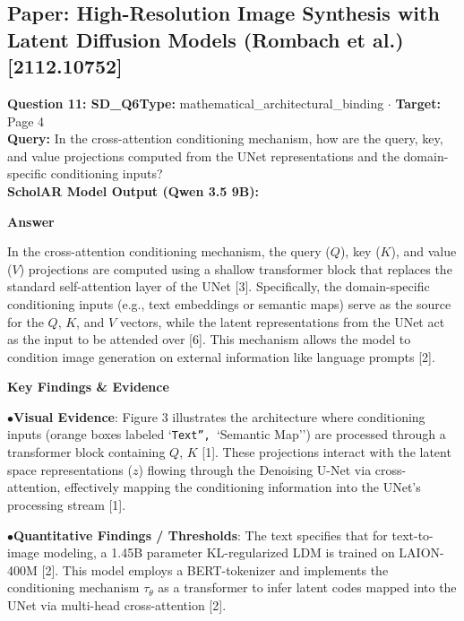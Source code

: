\documentclass[10pt,a4paper]{article}
\begin{document}
\subsection{Paper: High-Resolution Image Synthesis with Latent Diffusion Models (Rombach et al.) [2112.10752]}
\vspace{-4pt}
\begin{tcolorbox}[questionbox]
{\noindent\bfseries\large\color{navy} Question 11: SD\_Q6}\hfill {\footnotesize\color{darkteal}\textbf{Type:} mathematical\_architectural\_binding $\cdot$ \textbf{Target:} Page 4}\\[4pt]
{\noindent\bfseries\color{accentblue} Query: } In the cross-attention conditioning mechanism, how are the query, key, and value projections computed from the UNet representations and the domain-specific conditioning inputs?\\[6pt]
{\noindent\bfseries\color{navy} ScholAR Model Output (Qwen 3.5 9B):}\\[2pt]
{\small \noindent \textbf{Answer}\par\vspace{3pt}In the cross-attention conditioning mechanism, the query ($Q$), key ($K$), and value ($V$) projections are computed using a shallow transformer block that replaces the standard self-attention layer of the UNet [3]. Specifically, the domain-specific conditioning inputs (e.g., text embeddings or semantic maps) serve as the source for the $Q$, $K$, and $V$ vectors, while the latent representations from the UNet act as the input to be attended over [6]. This mechanism allows the model to condition image generation on external information like language prompts [2].\par\vspace{3pt}\noindent \textbf{Key Findings \& Evidence}\par\vspace{3pt}\noindent\hspace*{8pt}$\bullet$\hspace*{4pt}\textbf{Visual Evidence}: Figure 3  illustrates the architecture where conditioning inputs (orange boxes labeled `\texttt{Text'', }`Semantic Map'') are processed through a transformer block containing $Q$, $K$ [1]. These projections interact with the latent space representations ($z$) flowing through the Denoising U-Net via cross-attention, effectively mapping the conditioning information into the UNet's processing stream [1].\par\vspace{3pt}\noindent\hspace*{8pt}$\bullet$\hspace*{4pt}\textbf{Quantitative Findings / Thresholds}: The text specifies that for text-to-image modeling, a 1.45B parameter KL-regularized LDM is trained on LAION-400M [2]. This model employs a BERT-tokenizer and implements the conditioning mechanism $\tau_\theta$ as a transformer to infer latent codes mapped into the UNet via multi-head cross-attention [2].}\\[6pt]

\end{tcolorbox}
\end{document}

